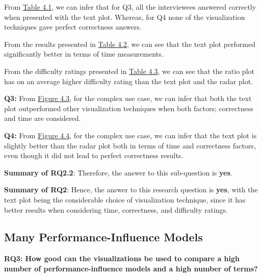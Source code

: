 \begin{description}[leftmargin=0pt]
\item[Correctness: ] From \hyperref[table:correctness]{Table 4.1}, we can infer that for Q3, all the interviewees answered correctly when presented with the text plot. Whereas, for Q4 none of the visualization techniques gave perfect correctness answers.

\item[Time Measurements: ] From the results presented in \hyperref[table:time]{Table 4.2}, we can see that the text plot performed significantly better in terms of time measurements.

\item[Difficulty Ratings: ] From the difficulty ratings presented in \hyperref[table:rating]{Table 4.3}, we can see that the ratio plot has on an average higher difficulty rating than the text plot and the radar plot.

\end{description}

\textbf{Q3:} From \hyperref[figure:paretoTwoQ3]{Figure 4.3}, for the complex use case, we can infer that both the text plot outperformed other visualization techniques when both factors; correctness and time are considered.

\textbf{Q4:} From \hyperref[figure:paretoTwoQ4]{Figure 4.4}, for the complex use case, we can infer that the text plot is slightly better than the radar plot both in terms of time and correctness factors, even though it did not lead to perfect correctness results.

\textbf{Summary of RQ2.2}: Therefore, the answer to this sub-question is \textbf{yes}.

\textbf{Summary of RQ2}: Hence, the answer to this research question is \textbf{yes}, with the text plot being the considerable choice of visualization technique, since it has better results when considering time, correctness, and difficulty ratings.

\subsection*{Many Performance-Influence Models}

\vskip 0.2in
\begin{mdframed}
\textbf{RQ3: How good can the visualizations be used to compare a high number of performance-influence models and a high number of terms?}
\end{mdframed}

